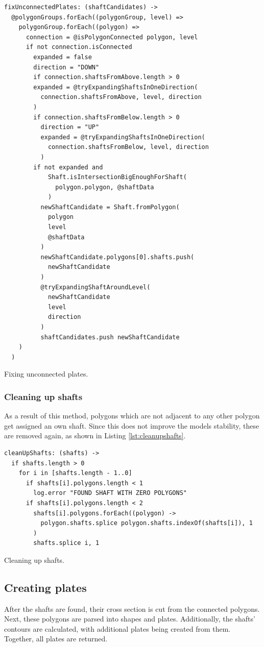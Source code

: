 \documentclass[../ClassicThesis.tex]{subfiles}
\begin{document}
\begin{listing}[ht]
\begin{verbatim}
fixUnconnectedPlates: (shaftCandidates) ->
  @polygonGroups.forEach((polygonGroup, level) =>
    polygonGroup.forEach((polygon) =>
      connection = @isPolygonConnected polygon, level
      if not connection.isConnected
        expanded = false
        direction = "DOWN"
        if connection.shaftsFromAbove.length > 0
        expanded = @tryExpandingShaftsInOneDirection(
          connection.shaftsFromAbove, level, direction
        )
        if connection.shaftsFromBelow.length > 0
          direction = "UP"
          expanded = @tryExpandingShaftsInOneDirection(
            connection.shaftsFromBelow, level, direction
          )
        if not expanded and 
            Shaft.isIntersectionBigEnoughForShaft(
              polygon.polygon, @shaftData
            )
          newShaftCandidate = Shaft.fromPolygon(
            polygon
            level
            @shaftData
          )
          newShaftCandidate.polygons[0].shafts.push(
            newShaftCandidate
          )
          @tryExpandingShaftAroundLevel(
            newShaftCandidate
            level
            direction
          )
          shaftCandidates.push newShaftCandidate
    )
  )
\end{verbatim}
\caption{Fixing unconnected plates.}
\label{lst:fixunconnected}
\end{listing}

\subsubsection{Cleaning up shafts}

As a result of this method, polygons which are not adjacent to any other polygon get assigned an own shaft. Since this does not improve the models stability, these are removed again, as shown in Listing \ref{lst:cleanupshafts}.

\begin{listing}[ht]
\begin{verbatim}
cleanUpShafts: (shafts) ->
  if shafts.length > 0
    for i in [shafts.length - 1..0]
      if shafts[i].polygons.length < 1
        log.error "FOUND SHAFT WITH ZERO POLYGONS"
      if shafts[i].polygons.length < 2
        shafts[i].polygons.forEach((polygon) ->
          polygon.shafts.splice polygon.shafts.indexOf(shafts[i]), 1
        )
        shafts.splice i, 1
\end{verbatim}
\caption{Cleaning up shafts.}
\label{lst:cleanupshafts}
\end{listing}

\subsection{Creating plates}

After the shafts are found, their cross section is cut from the connected polygons. Next, these polygons are parsed into shapes and plates. Additionally, the shafts' contours are calculated, with additional plates being created from them. Together, all plates are returned.
\end{document}
